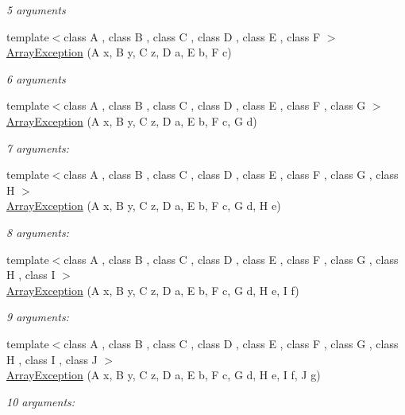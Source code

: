 \begin{DoxyCompactItemize}
\begin{DoxyCompactList}\small\item\em 5 arguments \end{DoxyCompactList}\item 
{\footnotesize template$<$class A , class B , class C , class D , class E , class F $>$ }\\\hyperlink{classArrays_1_1ArrayException_a1b43b4efda517fd21ed5028e703b322c}{Array\+Exception} (A x, B y, C z, D a, E b, F c)
\begin{DoxyCompactList}\small\item\em 6 arguments \end{DoxyCompactList}\item 
{\footnotesize template$<$class A , class B , class C , class D , class E , class F , class G $>$ }\\\hyperlink{classArrays_1_1ArrayException_a5d6e6a96e4a69859ff816f5cc60274b4}{Array\+Exception} (A x, B y, C z, D a, E b, F c, G d)
\begin{DoxyCompactList}\small\item\em 7 arguments\+: \end{DoxyCompactList}\item 
{\footnotesize template$<$class A , class B , class C , class D , class E , class F , class G , class H $>$ }\\\hyperlink{classArrays_1_1ArrayException_a2ca8fffce34e4c234569f28fa0db8f79}{Array\+Exception} (A x, B y, C z, D a, E b, F c, G d, H e)
\begin{DoxyCompactList}\small\item\em 8 arguments\+: \end{DoxyCompactList}\item 
{\footnotesize template$<$class A , class B , class C , class D , class E , class F , class G , class H , class I $>$ }\\\hyperlink{classArrays_1_1ArrayException_a84f6298d89d22d8ae56f87de3817d28b}{Array\+Exception} (A x, B y, C z, D a, E b, F c, G d, H e, I f)
\begin{DoxyCompactList}\small\item\em 9 arguments\+: \end{DoxyCompactList}\item 
{\footnotesize template$<$class A , class B , class C , class D , class E , class F , class G , class H , class I , class J $>$ }\\\hyperlink{classArrays_1_1ArrayException_aef59ade1904d9c101a03e943d9a0c503}{Array\+Exception} (A x, B y, C z, D a, E b, F c, G d, H e, I f, J g)
\begin{DoxyCompactList}\small\item\em 10 arguments\+: \end{DoxyCompactList}\end{DoxyCompactItemize}


